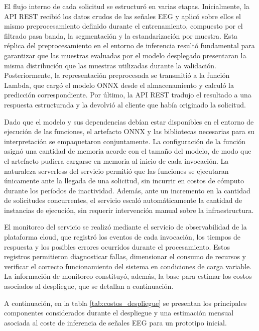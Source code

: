 El flujo interno de cada solicitud se estructuró en varias etapas. Inicialmente, la API REST recibió los datos crudos de las señales EEG y aplicó sobre ellos el mismo preprocesamiento definido durante el entrenamiento, compuesto por el filtrado pasa banda, la segmentación y la estandarización por muestra. Esta réplica del preprocesamiento en el entorno de inferencia resultó fundamental para garantizar que las muestras evaluadas por el modelo desplegado presentaran la misma distribución que las muestras utilizadas durante la validación. Posteriormente, la representación preprocesada se transmitió a la función Lambda, que cargó el modelo ONNX desde el almacenamiento y calculó la predicción correspondiente. Por último, la API REST tradujo el resultado a una respuesta estructurada y la devolvió al cliente que había originado la solicitud.

Dado que el modelo y sus dependencias debían estar disponibles en el entorno de ejecución de las funciones, el artefacto ONNX y las bibliotecas necesarias para su interpretación se empaquetaron conjuntamente. La configuración de la función asignó una cantidad de memoria acorde con el tamaño del modelo, de modo que el artefacto pudiera cargarse en memoria al inicio de cada invocación. La naturaleza serverless del servicio permitió que las funciones se ejecutaran únicamente ante la llegada de una solicitud, sin incurrir en costos de cómputo durante los períodos de inactividad. Además, ante un incremento en la cantidad de solicitudes concurrentes, el servicio escaló automáticamente la cantidad de instancias de ejecución, sin requerir intervención manual sobre la infraestructura.

El monitoreo del servicio se realizó mediante el servicio de observabilidad de la plataforma cloud, que registró los eventos de cada invocación, los tiempos de respuesta y los posibles errores ocurridos durante el procesamiento. Estos registros permitieron diagnosticar fallas, dimensionar el consumo de recursos y verificar el correcto funcionamiento del sistema en condiciones de carga variable. La información de monitoreo constituyó, además, la base para estimar los costos asociados al despliegue, que se detallan a continuación.

A continuación, en la tabla \ref{tab:costos_despliegue} se presentan los principales componentes considerados durante el despliegue y una estimación mensual asociada al coste de inferencia de señales EEG para un prototipo inicial.


